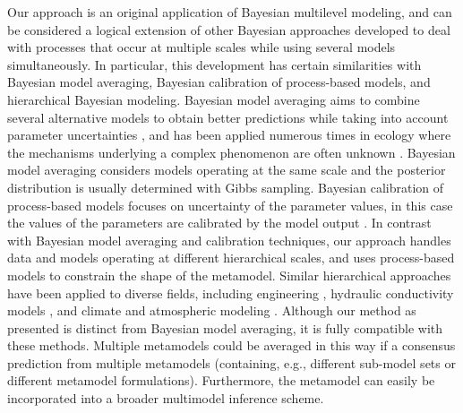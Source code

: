 \documentclass[11pt]{article}
\begin{document}
Our approach is an original application of Bayesian multilevel modeling, and can be considered a logical extension of other Bayesian approaches developed to deal with processes that occur at multiple scales while using several models simultaneously. 
In particular, this development has certain similarities with Bayesian model averaging, Bayesian calibration of process-based models, and hierarchical Bayesian modeling. 
Bayesian model averaging aims to combine several alternative models to obtain better predictions while taking into account parameter uncertainties \citep{Hoeting1999}, and has been applied numerous times in ecology where the mechanisms underlying a complex phenomenon are often unknown \citep[e.g.,][]{Wintle2003, Link2006}. 
Bayesian model averaging considers models operating at the same scale and the posterior distribution is usually determined with Gibbs sampling. 
Bayesian calibration of process-based models focuses on uncertainty of the parameter values, in this case the values of the parameters are calibrated by the model output \citep{VanOijen2005, Hartig2012}. 
In contrast with Bayesian model averaging and calibration techniques, our approach handles data and models operating at different hierarchical scales, and uses process-based models to constrain the shape of the metamodel.
Similar hierarchical approaches have been applied to diverse fields, including engineering \citep{Booth2013}, hydraulic conductivity models \citep{Dostert2009, Efendiev2005}, and climate and atmospheric modeling \citep{Mcmillan2010, Kang2012}.
Although our method as presented is distinct from Bayesian model averaging, it is fully compatible with these methods.
Multiple metamodels could be averaged in this way if a consensus prediction from multiple metamodels (containing, e.g., different sub-model sets or different metamodel formulations).
Furthermore, the metamodel can easily be incorporated into a broader multimodel inference scheme.

\end{document}
